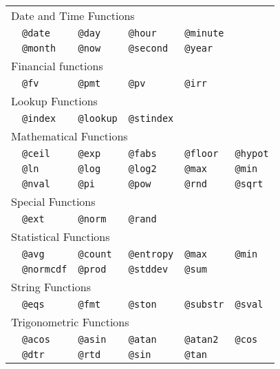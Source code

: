 \documentclass[titlepage]{article}
\begin{document}
\begin{tabular*}{.65\textwidth}{@{\extracolsep{\fill}}llllll}

\multicolumn{5}{l}{Date and Time Functions}\\[4pt]
& {\tt @date} & {\tt @day} & {\tt @hour} & {\tt @minute}\\
& {\tt @month } & {\tt @now} & {\tt @second} & {\tt @year}\\[8pt]


\multicolumn{5}{l}{Financial functions}\\[4pt]
& {\tt @fv} & {\tt @pmt} & {\tt @pv} & {\tt @irr}\\[8pt]

\multicolumn{5}{l}{Lookup Functions}\\[4pt]
&   {\tt @index} & {\tt @lookup} & {\tt @stindex} \\[8pt]

\multicolumn{5}{l}{Mathematical Functions}\\[4pt]
&   {\tt @ceil} & {\tt @exp} & {\tt @fabs} & {\tt @floor} & {\tt @hypot}\\
&   {\tt @ln} & {\tt @log} & {\tt @log2} & {\tt @max} & {\tt @min}\\
&   {\tt @nval} & {\tt @pi} & {\tt @pow} & {\tt @rnd} & {\tt @sqrt}\\[8pt]

\multicolumn{5}{l}{Special Functions}\\[4pt]
&  {\tt @ext} & {\tt @norm} & {\tt @rand}\\[8pt]

\multicolumn{5}{l}{Statistical Functions}\\[4pt]
&   {\tt @avg} & {\tt @count} & {\tt @entropy} & {\tt @max} & {\tt @min}\\
&   {\tt @normcdf} & {\tt @prod} & {\tt @stddev} & {\tt @sum}\\[8pt]

\multicolumn{5}{l}{String Functions}\\[4pt]
&   {\tt @eqs} & {\tt @fmt} & {\tt @ston} & {\tt @substr} & {\tt @sval}\\[8pt]

\multicolumn{5}{l}{Trigonometric Functions}\\[4pt]
&   {\tt @acos} & {\tt @asin} & {\tt @atan} & {\tt @atan2} & {\tt @cos}\\
&   {\tt @dtr} & {\tt @rtd} & {\tt @sin} & {\tt @tan}\\

\end{tabular*}
\end{document}
